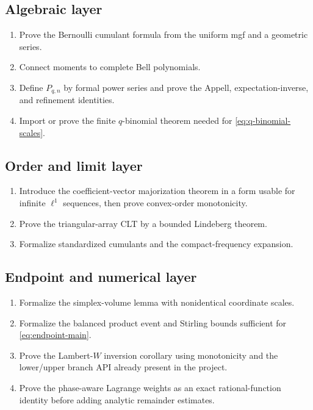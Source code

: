 \documentclass[11pt,oneside]{article}
\theoremstyle{definition}
\theoremstyle{remark}
\begin{document}
\subsection{Algebraic layer}

\begin{enumerate}
\item Prove the Bernoulli cumulant formula from the uniform mgf and a geometric series.
\item Connect moments to complete Bell polynomials.
\item Define $P_{q,n}$ by formal power series and prove the Appell, expectation-inverse, and
      refinement identities.
\item Import or prove the finite $q$-binomial theorem needed for
      \eqref{eq:q-binomial-scales}.
\end{enumerate}

\subsection{Order and limit layer}

\begin{enumerate}
\item Introduce the coefficient-vector majorization theorem in a form usable for infinite
      $\ell^1$ sequences, then prove convex-order monotonicity.
\item Prove the triangular-array CLT by a bounded Lindeberg theorem.
\item Formalize standardized cumulants and the compact-frequency expansion.
\end{enumerate}

\subsection{Endpoint and numerical layer}

\begin{enumerate}
\item Formalize the simplex-volume lemma with nonidentical coordinate scales.
\item Formalize the balanced product event and Stirling bounds sufficient for
      \eqref{eq:endpoint-main}.
\item Prove the Lambert-$W$ inversion corollary using monotonicity and the lower/upper branch
      API already present in the project.
\item Prove the phase-aware Lagrange weights as an exact rational-function identity before
      adding analytic remainder estimates.
\end{enumerate}
\end{document}
